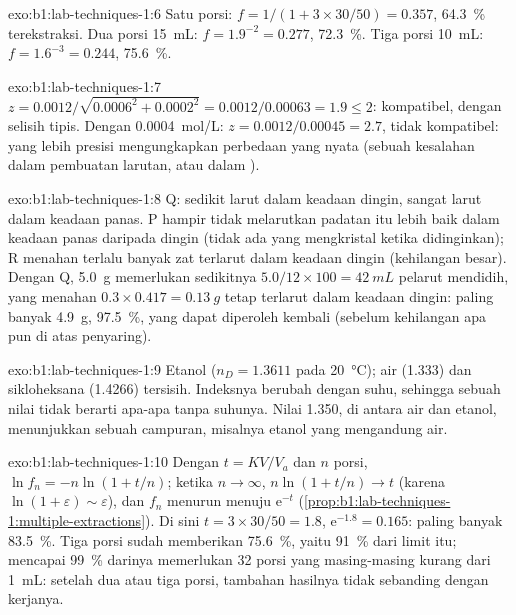 \begin{solution}{exo:b1:lab-techniques-1:6}
Satu porsi: $f = 1/(1 + 3 \times 30/50) = 0.357$, \qty{64.3}{\percent}
terekstraksi. Dua porsi \qty{15}{mL}: $f = 1.9^{-2} = 0.277$,
\qty{72.3}{\percent}. Tiga porsi \qty{10}{mL}: $f = 1.6^{-3} = 0.244$,
\qty{75.6}{\percent}.
\end{solution}

\begin{solution}{exo:b1:lab-techniques-1:7}
$z = 0.0012/\sqrt{0.0006^2 + 0.0002^2} = 0.0012/0.00063 = 1.9 \le 2$:
kompatibel, dengan selisih tipis. Dengan \qty{0.0004}{mol/L}: $z = 0.0012/0.00045 = 2.7$,
tidak kompatibel:  yang lebih presisi mengungkapkan perbedaan yang
nyata (sebuah kesalahan dalam pembuatan larutan, atau dalam ).
\end{solution}

\begin{solution}{exo:b1:lab-techniques-1:8}
Q: sedikit larut dalam keadaan dingin, sangat larut dalam keadaan panas.
P hampir tidak melarutkan padatan itu lebih baik dalam keadaan panas
daripada dingin (tidak ada yang mengkristal ketika didinginkan); R
menahan terlalu banyak zat terlarut dalam keadaan dingin (kehilangan
besar). Dengan Q, \qty{5.0}{g} memerlukan sedikitnya
$5.0/12 \times 100 = \qty{42}{mL}$ pelarut mendidih, yang menahan
$0.3 \times 0.417 = \qty{0.13}{g}$ tetap terlarut dalam keadaan dingin:
paling banyak \qty{4.9}{g}, \qty{97.5}{\percent}, yang dapat diperoleh
kembali (sebelum kehilangan apa pun di atas penyaring).
\end{solution}

\begin{solution}{exo:b1:lab-techniques-1:9}
Etanol ($n_D = 1.3611$ pada \qty{20}{\celsius}); air (1.333) dan
sikloheksana (1.4266) tersisih. Indeksnya berubah dengan suhu, sehingga
sebuah nilai tidak berarti apa-apa tanpa suhunya. Nilai 1.350, di antara
air dan etanol, menunjukkan sebuah campuran, misalnya etanol yang
mengandung air.
\end{solution}

\begin{solution}{exo:b1:lab-techniques-1:10}
Dengan $t = KV/V_a$ dan $n$ porsi, $\ln f_n = -n\ln(1 + t/n)$; ketika
$n \to \infty$, $n \ln(1 + t/n) \to t$ (karena $\ln(1 + \varepsilon) \sim
\varepsilon$), dan $f_n$ menurun menuju $\mathrm{e}^{-t}$ (\cref{prop:b1:lab-techniques-1:multiple-extractions}).
Di sini $t = 3 \times 30/50 = 1.8$, $\mathrm{e}^{-1.8} = 0.165$: paling
banyak \qty{83.5}{\percent}. Tiga porsi sudah memberikan
\qty{75.6}{\percent}, yaitu \qty{91}{\percent} dari limit itu; mencapai
\qty{99}{\percent} darinya memerlukan 32 porsi yang masing-masing kurang
dari \qty{1}{mL}: setelah dua atau tiga porsi, tambahan hasilnya tidak
sebanding dengan kerjanya.
\end{solution}

